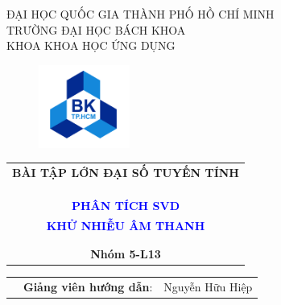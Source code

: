 \documentclass[11pt,a4paper]{article}
\begin{document}
	\begin{titlepage}
		\begin{center}
			ĐẠI HỌC QUỐC GIA THÀNH PHỐ HỒ CHÍ MINH\\
			TRƯỜNG ĐẠI HỌC BÁCH KHOA\\
			KHOA KHOA HỌC ỨNG DỤNG\\
		\end{center}
		\begin{figure}[h!]
			\begin{center}
				\vspace{0.5cm}
				\includegraphics[width=3cm]{hcmut.png}
			\end{center}
		\end{figure}
		\vspace{2cm}
		\begin{center}
			\begin{tabular}{c}
				\textbf{{\Large BÀI TẬP LỚN ĐẠI SỐ TUYẾN TÍNH}}\\ \\
				\hline
				\\ \\
				\textbf{\huge{\textcolor{blue}{PHÂN TÍCH SVD }}} \\
				\textbf{\huge{\textcolor{blue}{KHỬ NHIỄU ÂM THANH}}} \\
				\\ \\
				\hline
				\textbf{{\Large Nhóm 5-L13}}
			\end{tabular}
		\end{center}
		\vspace{3cm}
		
		\begin{table}[h]
			\begin{tabular}{rrl}
				\hspace{5 cm} & \textbf{Giảng viên hướng dẫn}: &Nguyễn Hữu Hiệp\\
				
				

\end{tabular}
\end{table}
\end{titlepage}
\end{document}
